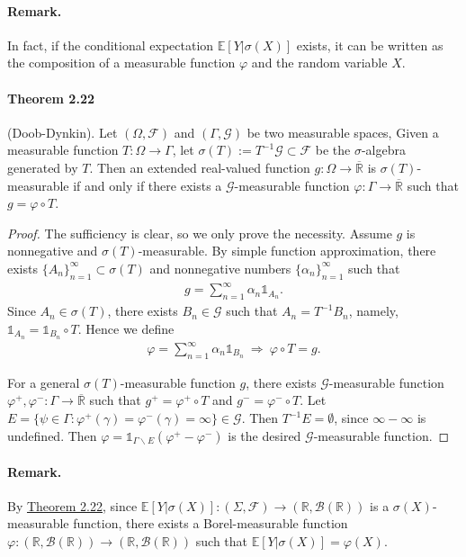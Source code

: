 \documentclass{article}
\numberwithin{equation}{section}
\newcommand{\E}{\mathbb{E}}
\theoremstyle{plain}
\theoremstyle{definition}
\begin{document}
\paragraph{Remark.} In fact, if the conditional expectation $\E[Y|\sigma(X)]$ exists, it can be written as the composition of a measurable function $\varphi$ and the random variable $X$.

\paragraph{Theorem 2.22\label{thm:2.22}} (Doob-Dynkin). Let $(\Omega,\mathscr{F})$ and $(\Gamma,\mathscr{G})$ be two measurable spaces, Given a measurable function $T:\Omega\to\Gamma$, let $\sigma(T):=T^{-1}\mathscr{G}\subset\mathscr{F}$ be the $\sigma$-algebra generated by $T$. Then an extended real-valued function $g:\Omega\to\overline{\mathbb{R}}$ is $\sigma(T)$-measurable if and only if there exists a $\mathscr{G}$-measurable function $\varphi:\Gamma\to\overline{\mathbb{R}}$ such that $g=\varphi\circ T$. 

\begin{proof}
The sufficiency is clear, so we only prove the necessity. Assume $g$ is nonnegative and $\sigma(T)$-measurable. By simple function approximation, there exists $\{A_n\}_{n=1}^\infty\subset\sigma(T)$ and nonnegative numbers $\{\alpha_n\}_{n=1}^\infty$ such that
\begin{align*}
	g=\sum_{n=1}^\infty\alpha_n\mathds{1}_{A_n}.
\end{align*}
Since $A_n\in\sigma(T)$, there exists $B_n\in\mathscr{G}$ such that $A_n=T^{-1}B_n$, namely, $\mathds{1}_{A_n}=\mathds{1}_{B_n}\circ T$. Hence we define
\begin{align*}
	\varphi=\sum_{n=1}^\infty\alpha_n\mathds{1}_{B_n}\ \Rightarrow\ \varphi\circ T = g.
\end{align*}

For a general $\sigma(T)$-measurable function $g$, there exists $\mathscr{G}$-measurable function $\varphi^+,\varphi^-:\Gamma\to\overline{\mathbb{R}}$ such that $g^+=\varphi^+\circ T$ and $g^-=\varphi^-\circ T$. Let $E=\{\psi\in\Gamma:\varphi^+(\gamma)=\varphi^-(\gamma)=\infty\}\in\mathscr{G}$. Then $T^{-1}E=\emptyset$, since $\infty-\infty$ is undefined. Then $\varphi=\mathds{1}_{\Gamma\backslash E}(\varphi^+-\varphi^-)$ is the desired $\mathscr{G}$-measurable function.
\end{proof}

\paragraph{Remark.} By \hyperref[thm:2.22]{Theorem 2.22}, since $\E[Y|\sigma(X)]:(\Sigma,\mathscr{F})\to(\mathbb{R},\mathscr{B}(\mathbb{R}))$ is a $\sigma(X)$-measurable function, there exists a Borel-measurable function $\varphi:(\mathbb{R},\mathscr{B}(\mathbb{R}))\to(\mathbb{R},\mathscr{B}(\mathbb{R}))$ such that $\E[Y|\sigma(X)]=\varphi(X)$.
\end{document}
